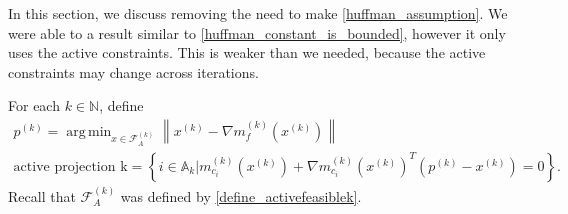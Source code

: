 \documentclass{article}
\theoremstyle{case}
\numberwithin{theorem}{subsection}
\DeclareMathOperator*{\argmin}{arg\,min}
\newcommand{\activeconstraintsk}{{\mathbb A_{k}}}
\newcommand{\gk}{{\nabla m_f^{(k)}\left(\xk\right)}}
\newcommand{\gmcik}{{\nabla m_{c_i}^{(k)}\left(\xk\right)}}
\newcommand{\mcik}{{{m}^{(k)}_{c_i}}}
\newcommand{\naturals}{\mathbb N}
\newcommand{\xk}{x^{(k)}}
\newcommand{\activefeasiblek}{{\mathcal F^{(k)}_A}}
\newcommand{\projk}{{p^{(k)}}}
\newcommand{\activeprojk}{{\textrm{active projection k}}}
\begin{document}
In this section, we discuss removing the need to make \cref{huffman_assumption}.
We were able to a result similar to \cref{huffman_constant_is_bounded}, however it only uses the active constraints.
This is weaker than we needed, because the active constraints may change across iterations.

For each $k \in \naturals$, define
\begin{align}
\projk = \argmin_{x \in \activefeasiblek} \left\|\xk - \gk\right\| \label{define_projectionk} \\
\activeprojk = \left\{ i \in \activeconstraintsk \bigg| \mcik\left(\xk\right) + \gmcik^T \left(\projk - \xk\right) = 0 \right\} \label{define_active_projection_indices}
.
\end{align}
Recall that $\activefeasiblek$ was defined by \cref{define_activefeasiblek}.
\end{document}
